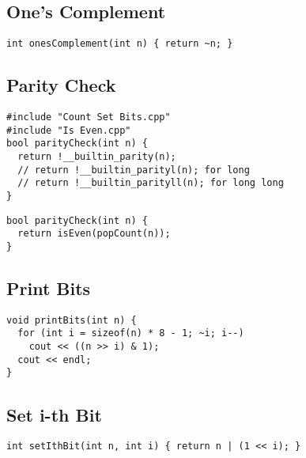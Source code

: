 \documentclass[twoside]{article}
\begin{document}
\begin{multicols*}{2}
\subsectionfont{\large\bfseries\sffamily\underline}
\subsection*{One's Complement}
\begin{verbatim}
int onesComplement(int n) { return ~n; }
\end{verbatim}

\subsectionfont{\large\bfseries\sffamily\underline}
\subsection*{Parity Check}
\begin{verbatim}
#include "Count Set Bits.cpp"
#include "Is Even.cpp"
bool parityCheck(int n) {
  return !__builtin_parity(n);
  // return !__builtin_parityl(n); for long
  // return !__builtin_parityll(n); for long long
}
\end{verbatim}
\vspace{-12pt}
\begin{verbatim}
bool parityCheck(int n) {
  return isEven(popCount(n));
}
\end{verbatim}

\subsectionfont{\large\bfseries\sffamily\underline}
\subsection*{Print Bits}
\begin{verbatim}
void printBits(int n) {
  for (int i = sizeof(n) * 8 - 1; ~i; i--)
    cout << ((n >> i) & 1);
  cout << endl;
}
\end{verbatim}

\subsectionfont{\large\bfseries\sffamily\underline}
\subsection*{Set i-th Bit}
\begin{verbatim}
int setIthBit(int n, int i) { return n | (1 << i); }
\end{verbatim}

\subsectionfont{\large\bfseries\sffamily\underline}

\end{multicols*}
\end{document}
